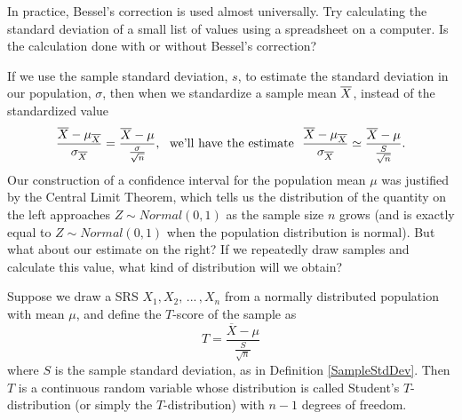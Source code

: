 In practice, Bessel's correction is used almost universally. Try calculating the standard deviation of a small list of values using a spreadsheet on a computer. Is the calculation done with or without Bessel's correction?
\par
If we use the sample standard deviation, $s$, to estimate the standard deviation in our population, $\sigma$, then when we standardize a sample mean ${\overline{X}}$, instead of the standardized value
$$\frac{\overline{X} - \mu_{\overline{X}}}{\sigma_{\overline{X}}} = \frac{\overline{X} - \mu}{\frac{\sigma}{\sqrt{n}}}, \ \ \text{we'll have the estimate} \ \ \frac{\overline{X} - \mu_{\overline{X}}}{\sigma_{\overline{X}}} \simeq \frac{\overline{X} - \mu}{\frac{S}{\sqrt{n}}}.$$
Our construction of a confidence interval for the population mean $\mu$ was justified by the Central Limit Theorem, which tells us the distribution of the quantity on the left approaches $Z \sim Normal(0,1)$ as the sample size $n$ grows (and is exactly equal to $Z \sim Normal(0,1)$ when the population distribution is normal). But what about our estimate on the right? If we repeatedly draw samples and calculate this value, what kind of distribution will we obtain?
\par
\begin{defn}\label{TDistDef} Suppose we draw a SRS $X_1, X_2, \, ... \, , X_n$ from a normally distributed population with mean $\mu$, and define the $T$-score of the sample as
$$T = \frac{\overline{X} - \mu}{\frac{S}{\sqrt{n}}}$$
where $S$ is the sample standard deviation, as in Definition \ref{SampleStdDev}. Then $T$ is a continuous random variable whose distribution is called Student's $T$-distribution (or simply the $T$-distribution) with $n-1$ degrees of freedom.
\end{defn}
\begin{center}
\end{center}

